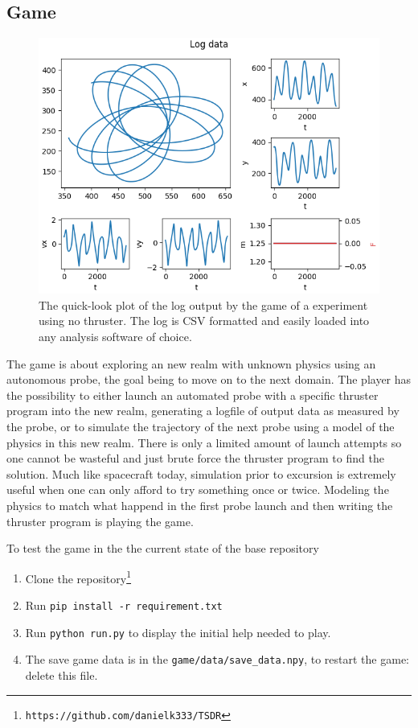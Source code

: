 \documentclass[11pt, twocolumn]{article}
\begin{document}
\subsection{Game}


\begin{figure}
    \centering
    \includegraphics[width=0.9\hsize]{game_log.png}
    \caption{The quick-look plot of the log output by the game of a experiment using no thruster. The log is CSV formatted and easily loaded into any analysis software of choice.}
    \label{fig:game_log}
\end{figure}

The game is about exploring an new realm with unknown physics using an autonomous probe, the goal being to move on to the next domain. The player has the possibility to either launch an automated probe with a specific thruster program into the new realm, generating a logfile of output data as measured by the probe, or to simulate the trajectory of the next probe using a model of the physics in this new realm. There is only a limited amount of launch attempts so one cannot be wasteful and just brute force the thruster program to find the solution. Much like spacecraft today, simulation prior to excursion is extremely useful when one can only afford to try something once or twice. Modeling the physics to match what happend in the first probe launch and then writing the thruster program is playing the game.

To test the game in the the current state of the base repository
\begin{enumerate}
    \item Clone the repository\footnote{\label{link}\texttt{https://github.com/danielk333/TSDR}}
    \item Run \texttt{pip install -r requirement.txt}
    \item Run \texttt{python run.py} to display the initial help needed to play.
    \item The save game data is in the \texttt{game/data/save\_data.npy}, to restart the game: delete this file.
\end{enumerate}
\end{document}

